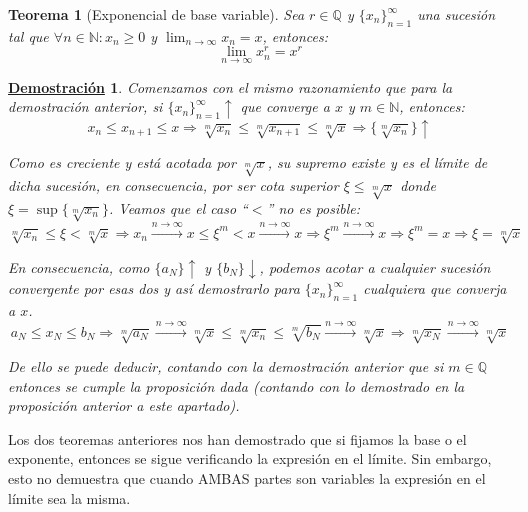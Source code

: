 \documentclass[10pt,a4paper,openright]{book}
\theoremstyle{break}
\newtheorem{theo}{Teorema}[chapter]
\newtheorem*{demo}{\underline{Demostración}}
\begin{document}
\begin{theo}[Exponencial de base variable]
Sea $r\in \mathbb Q$ y $\{x_n\}_{n=1}^\infty$ una sucesión tal que $\forall n\in \mathbb N: x_n\geq 0$ y $\lim_{n\rightarrow\infty} x_n = x$, entonces:
$$\lim_{n\rightarrow\infty}x_n^{r} = x^r$$
\end{theo}
\begin{demo}
Comenzamos con el mismo razonamiento que para la demostración anterior, si $\{x_n\}_{n=1}^\infty\uparrow$ que converge a $x$ y $m\in \mathbb N$, entonces:
$$x_n\leq x_{n+1}\leq x\Rightarrow \sqrt[m]{x_n}\leq \sqrt[m]{x_{n+1}}\leq \sqrt[m]{x} \Rightarrow \{\sqrt[m]{x_n}\}\uparrow$$

Como es creciente y está acotada por $\sqrt[m]{x}$, su supremo existe y es el límite de dicha sucesión, en consecuencia, por ser cota superior $\xi\leq \sqrt[m]{x}$ donde $\xi=\sup\{\sqrt[m]{x_n}\}$. Veamos que el caso ``$<$'' no es posible:
$$\sqrt[m]{x_n}\leq \xi< \sqrt[m]{x}\Rightarrow x_n\xrightarrow{n\rightarrow\infty}x\leq \xi^m<x\xrightarrow{n\rightarrow\infty}x\Rightarrow \xi^m\xrightarrow{n\rightarrow\infty}x\Rightarrow \xi^m=x\Rightarrow \xi=\sqrt[m]{x}$$

En consecuencia, como $\{a_N\}\uparrow$ y $\{b_N\}\downarrow$, podemos acotar a cualquier sucesión convergente por esas dos y así demostrarlo para $\{x_n\}_{n=1}^\infty$ cualquiera que converja a $x$.
$$a_N\leq x_N\leq b_N\Rightarrow \sqrt[m]{a_N}\xrightarrow{n\rightarrow\infty}\sqrt[m]{x}\leq \sqrt[m]{x_n}\leq \sqrt[m]{b_N}\xrightarrow{n\rightarrow\infty}\sqrt[m]{x}\Rightarrow \sqrt[m]{x_N}\xrightarrow{n\rightarrow\infty}\sqrt[m]{x}$$

De ello se puede deducir, contando con la demostración anterior que si $m\in \mathbb Q$ entonces se cumple la proposición dada (contando con lo demostrado en la proposición anterior a este apartado).
\end{demo}

Los dos teoremas anteriores nos han demostrado que si fijamos la base o el exponente, entonces se sigue verificando la expresión en el límite. Sin embargo, esto no demuestra que cuando AMBAS partes son variables la expresión en el límite sea la misma.
\end{document}

